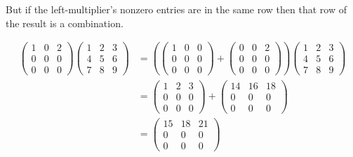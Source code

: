 \par\noindent But if the left-multiplier's nonzero entries are in the same row
then that row of the result is a combination.
\begin{example}
\begin{align*}
    \begin{pmatrix}
       1  &0  &2  \\
       0  &0  &0  \\
       0  &0  &0
    \end{pmatrix}
    \begin{pmatrix}
       1  &2  &3  \\
       4  &5  &6  \\
       7  &8  &9
    \end{pmatrix}
  &=(  \begin{pmatrix}
          1  &0  &0  \\
          0  &0  &0  \\
          0  &0  &0
       \end{pmatrix}
    +
       \begin{pmatrix}
          0  &0  &2  \\
          0  &0  &0  \\
          0  &0  &0
       \end{pmatrix}     )
      \begin{pmatrix}
         1  &2  &3  \\
         4  &5  &6  \\
         7  &8  &9
      \end{pmatrix}                     \\
  &=\begin{pmatrix}
       1  &2  &3  \\
       0  &0  &0  \\
       0  &0  &0
    \end{pmatrix}
  +
    \begin{pmatrix}
      14  &16 &18 \\
       0  &0  &0  \\
       0  &0  &0
    \end{pmatrix}                      \\
  &=\begin{pmatrix}
      15  &18 &21 \\
       0  &0  &0  \\
       0  &0  &0
    \end{pmatrix}
\end{align*}
\end{example}

